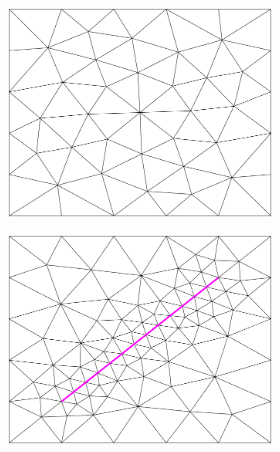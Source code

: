 \begin{figure}[p]
    \centering
    \begin{subfigure}[b]{\textwidth}
        \centering
        \begin{subfigure}[b]{0.32\textwidth}
            \centering
            \includegraphics[width=\textwidth]{report/Images/Software/Gmsh meshing algorithms/gmsh_meshing_algorithms_meshadapt.png}
        \end{subfigure}
        \begin{subfigure}[b]{0.32\textwidth}
            \centering
            \includegraphics[width=\textwidth]{report/Images/Software/Gmsh meshing algorithms/gmsh_meshing_algorithms_embedded_meshadapt.png}

\end{subfigure}
\end{subfigure}
\end{figure}
